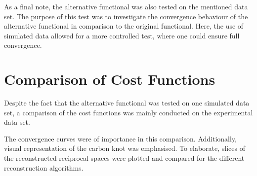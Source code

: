 As a final note, the alternative functional was also tested on the mentioned data set.
The purpose of this test was to investigate the convergence behaviour of the alternative functional in comparison to the original functional.
Here, the use of simulated data allowed for a more controlled test, where one could ensure full convergence.

\section{Comparison of Cost Functions}

Despite the fact that the alternative functional was tested on one simulated data set,
a comparison of the cost functions was mainly conducted on the experimental data set.

The convergence curves were of importance in this comparison.
Additionally, visual representation of the carbon knot was emphasised.
To elaborate, slices of the reconstructed reciprocal spaces were plotted and compared for the different reconstruction algorithms.